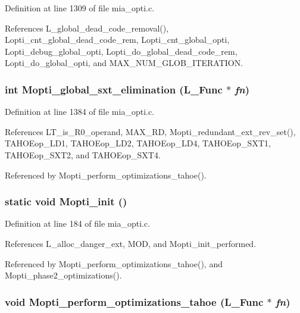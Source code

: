 Definition at line 1309 of file mia\_\-opti.c.

References L\_\-global\_\-dead\_\-code\_\-removal(), Lopti\_\-cnt\_\-global\_\-dead\_\-code\_\-rem, Lopti\_\-cnt\_\-global\_\-opti, Lopti\_\-debug\_\-global\_\-opti, Lopti\_\-do\_\-global\_\-dead\_\-code\_\-rem, Lopti\_\-do\_\-global\_\-opti, and MAX\_\-NUM\_\-GLOB\_\-ITERATION.
\subsubsection{\setlength{\rightskip}{0pt plus 5cm}int Mopti\_\-global\_\-sxt\_\-elimination (L\_\-Func $\ast$ {\em fn})}\label{mia__opti_8c_258d13a44eb860f3f27738a61d97f914}




Definition at line 1384 of file mia\_\-opti.c.

References LT\_\-is\_\-R0\_\-operand, MAX\_\-RD, Mopti\_\-redundant\_\-ext\_\-rev\_\-set(), TAHOEop\_\-LD1, TAHOEop\_\-LD2, TAHOEop\_\-LD4, TAHOEop\_\-SXT1, TAHOEop\_\-SXT2, and TAHOEop\_\-SXT4.

Referenced by Mopti\_\-perform\_\-optimizations\_\-tahoe().
\subsubsection{\setlength{\rightskip}{0pt plus 5cm}static void Mopti\_\-init ()\hspace{0.3cm}{\tt  [static]}}\label{mia__opti_8c_fd207341cfc48b1d9e2d578bbcd21f17}




Definition at line 184 of file mia\_\-opti.c.

References L\_\-alloc\_\-danger\_\-ext, MOD, and Mopti\_\-init\_\-performed.

Referenced by Mopti\_\-perform\_\-optimizations\_\-tahoe(), and Mopti\_\-phase2\_\-optimizations().
\subsubsection{\setlength{\rightskip}{0pt plus 5cm}void Mopti\_\-perform\_\-optimizations\_\-tahoe (L\_\-Func $\ast$ {\em fn})}\label{mia__opti_8c_b608d83646fb9d2a6cb3198df341cb05}




